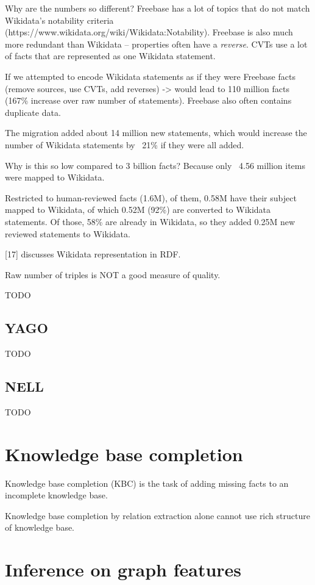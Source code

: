 Why are the numbers so different? Freebase has a lot of topics that do not match
Wikidata's notability criteria (https://www.wikidata.org/wiki/Wikidata:Notability).
Freebase is also much more redundant than Wikidata -- properties often have a
\textit{reverse}.
CVTs use a lot of facts that are represented as one Wikidata statement.

If we attempted to encode Wikidata statements as if they were Freebase facts
(remove sources, use CVTs, add reverses) -> would lead to 110 million facts
(167\% increase over raw number of statements).
Freebase also often contains duplicate data.

The migration added about 14 million new statements, which would increase the
number of Wikidata statements by ~21\% if they were all added.

Why is this so low compared to 3 billion facts? Because only ~4.56 million items
were mapped to Wikidata.

Restricted to human-reviewed facts (1.6M), of them, 0.58M have their subject
mapped to Wikidata, of which 0.52M (92\%) are converted to Wikidata statements.
Of those, 58\% are already in Wikidata, so they added 0.25M new reviewed
statements to Wikidata.

[17] discusses Wikidata representation in RDF.

Raw number of triples is NOT a good measure of quality.

TODO

\subsection{YAGO}

TODO

\subsection{NELL}

TODO

\section{Knowledge base completion}

Knowledge base completion (KBC) is the task of adding missing facts to an
incomplete knowledge base.

Knowledge base completion by relation extraction alone cannot use rich structure
of knowledge base.

\section{Inference on graph features}

